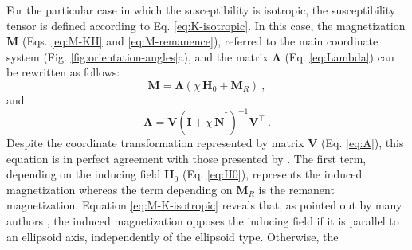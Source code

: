 \documentclass[gmd, manuscript]{copernicus}
\begin{document}
For the particular case in which the susceptibility is isotropic,
the susceptibility tensor is defined according to Eq. \ref{eq:K-isotropic}.
In this case, the magnetization $\mathbf{M}$ (Eqs. \ref{eq:M-KH} and \ref{eq:M-remanence}),
referred to the main coordinate system (Fig. \ref{fig:orientation-angles}a),
and the matrix $\mathbf{\Lambda}$ (Eq. \ref{eq:Lambda})
can be rewritten as follows:
\begin{equation}
\mathbf{M} = \mathbf{\Lambda} \left( \chi \, \mathbf{H}_{0} +
\mathbf{M}_{R} \right) \: ,
\label{eq:M-K-isotropic}
\end{equation}
and
\begin{equation}
\mathbf{\Lambda} = \mathbf{V}
\left( \mathbf{I} + \chi \, \tilde{\mathbf{N}}^{\dagger} \right)^{-1}
\mathbf{V}^{\top} \: .
\label{eq:Lambda-K-isotropic}
\end{equation}
Despite the coordinate transformation represented by
matrix $\mathbf{V}$ (Eq. \ref{eq:A}),
this equation is in perfect agreement with those presented
by \citet[Eqs. ~13--15]{guo2001}.
The first term, depending on the inducing field $\mathbf{H}_{0}$
(Eq. \ref{eq:H0}),
represents the induced magnetization whereas the term depending on
$\mathbf{M}_{R}$ is the remanent magnetization.
Equation \ref{eq:M-K-isotropic} reveals that, as pointed out by
many authors
\citep[e.g.,][]{maxwell1873, dubois1896, stoner1945, clark1986, sttraton2007},
the induced magnetization opposes the inducing field
if it is parallel to an ellipsoid axis,
independently of the ellipsoid type. Otherwise, the
\end{document}
